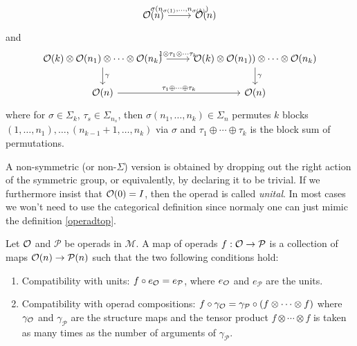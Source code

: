 \documentclass[TFM.tex]{subfiles}
\begin{document}
\begin{defi}
\begin{enumerate}
\begin{itemize}
\[\begin{tikzcd}
\OO(n) \arrow[r, "{\sigma(n_{\sigma(1)},\dots,n_{\sigma(k)})}"]& \OO(n)
\end{tikzcd}
\]
and
\[
\begin{tikzcd}
\OO(k)\otimes \OO(n_1)\otimes \cdots \otimes \OO(n_k)\arrow[r, "1\otimes \tau_1\otimes\cdots\tau_k"]\arrow[d, "\gamma"] & \OO(k)\otimes\OO(n_1))\otimes\cdots\otimes \OO(n_k)\arrow[d,"\gamma"]\\
\OO(n)\arrow[r, "\tau_1\oplus\cdots\oplus\tau_k"] & \OO(n)
\end{tikzcd}
\]
where for $\sigma\in\Sigma_k$, $\tau_s\in\Sigma_{n_s}$, then $\sigma(n_1,\dots, n_k)\in\Sigma_n$ permutes $k$ blocks $(1,\dots, n_1),\dots, (n_{k-1}+1,\dots, n_k)$ via $\sigma$ and $\tau_1\oplus\cdots\oplus\tau_k$ is the block sum of permutations.
\end{itemize}

\end{enumerate}



\end{defi}

A non-symmetric (or non-$\Sigma$) version is obtained by dropping out the right action of the symmetric group, or equivalently, by declaring it to be trivial. If we furthermore insist that ${\mathcal O}(0)=I$, then the operad is called \emph{unital}. In most cases we won't need to use the categorical definition since normaly one can just mimic the definition \ref{operadtop}.


\begin{defi}
Let ${\mathcal O}$ and $\mathcal{P}$ be operads in $\mathscr{M}$. A map of operads $f:{\mathcal O}\to \mathcal{P}$ is a collection of maps ${\mathcal O}(n)\to \mathcal{P}(n)$ such that the two following conditions hold:
\begin{enumerate}
\item Compatibility with units:  $f\circ e_{\mathcal O}=e_\mathcal{P}$, where $e_{\mathcal O}$ and $e_\mathcal{P}$ are the units.
\item Compatibility with operad compositions: $f\circ \gamma_{\mathcal O}=\gamma_\mathcal{P}\circ (f\otimes\cdots\otimes f)$ where $\gamma_{\mathcal O}$ and $\gamma_\mathcal{P}$ are the structure maps and the tensor product $f\otimes\cdots\otimes f$ is taken as many times as the number of arguments of $\gamma_\mathcal{P}$. 
\end{enumerate}
\end{defi}
\end{document}
